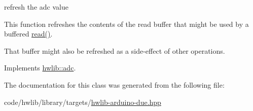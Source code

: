 refresh the adc value

This function refreshes the contents of the read buffer that might be used by a buffered \hyperlink{classdue_1_1pin__adc_a3b562b594bbbe3e8815a9223fa6520cc}{read()}.

That buffer might also be refreshed as a side-\/effect of other operations. 

Implements \hyperlink{classhwlib_1_1adc_a5484571b18d647ec78ba97e94c7ed836}{hwlib\+::adc}.



The documentation for this class was generated from the following file\+:\begin{DoxyCompactItemize}
\item 
code/hwlib/library/targets/\hyperlink{hwlib-arduino-due_8hpp}{hwlib-\/arduino-\/due.\+hpp}\end{DoxyCompactItemize}
